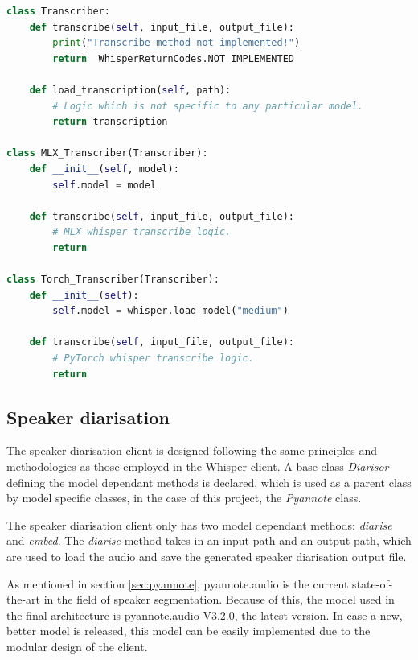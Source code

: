 \documentclass[twoside]{uva-inf-bachelor-thesis}
\begin{document}
\begin{lstlisting}[language=Python, caption={Modular transcriber class implemented in Apple's MLX Whisper port and PyTorch's Whisper port.}]
class Transcriber:
    def transcribe(self, input_file, output_file):
        print("Transcribe method not implemented!")
        return  WhisperReturnCodes.NOT_IMPLEMENTED

    def load_transcription(self, path):
        # Logic which is not specific to any particular model.
        return transcription

class MLX_Transcriber(Transcriber):
    def __init__(self, model):
        self.model = model

    def transcribe(self, input_file, output_file):
        # MLX whisper transcribe logic.
        return

class Torch_Transcriber(Transcriber):
    def __init__(self):
        self.model = whisper.load_model("medium")

    def transcribe(self, input_file, output_file):
        # PyTorch whisper transcribe logic.
        return
\end{lstlisting}

\subsection{Speaker diarisation}
The speaker diarisation client is designed following the same principles and methodologies as those employed in the Whisper client. A base class \textit{Diarisor} defining the model dependant methods is declared, which is used as a parent class by model specific classes, in the case of this project, the \textit{Pyannote} class.

The speaker diarisation client only has two model dependant methods: \textit{diarise} and \textit{embed}. The \textit{diarise} method takes in an input path and an output path, which are used to load the audio and save the generated speaker diarisation output file.

As mentioned in section \ref{sec:pyannote}, pyannote.audio is the current state-of-the-art in the field of speaker segmentation. Because of this, the model used in the final architecture is pyannote.audio V3.2.0, the latest version. In case a new, better model is released, this model can be easily implemented due to the modular design of the client.
\\\\ %
\end{document}
